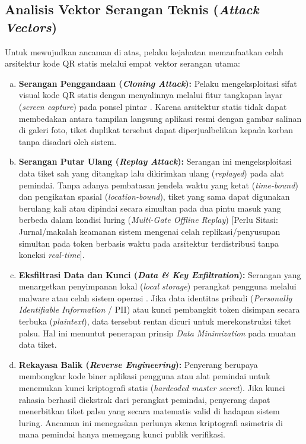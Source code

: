 \subsection{Analisis Vektor Serangan Teknis (\textit{Attack Vectors})}
Untuk mewujudkan ancaman di atas, pelaku kejahatan memanfaatkan celah arsitektur kode QR statis melalui empat vektor serangan utama:

\begin{enumerate}[a)]
    \item \textbf{Serangan Penggandaan (\textit{Cloning Attack}): }
    Pelaku mengeksploitasi sifat visual kode QR statis dengan menyalinnya melalui fitur tangkapan layar (\textit{screen capture}) pada ponsel pintar \cite{sung2015security}. Karena arsitektur statis tidak dapat membedakan antara tampilan langsung aplikasi resmi dengan gambar salinan di galeri foto, tiket duplikat tersebut dapat diperjualbelikan kepada korban tanpa disadari oleh sistem.
    
    \item \textbf{Serangan Putar Ulang (\textit{Replay Attack}): }
    Serangan ini mengeksploitasi data tiket sah yang ditangkap lalu dikirimkan ulang (\textit{replayed}) pada alat pemindai. Tanpa adanya pembatasan jendela waktu yang ketat (\textit{time-bound}) dan pengikatan spasial (\textit{location-bound}), tiket yang sama dapat digunakan berulang kali atau dipindai secara simultan pada dua pintu masuk yang berbeda dalam kondisi luring (\textit{Multi-Gate Offline Replay}) [Perlu Sitasi: Jurnal/makalah keamanan sistem mengenai celah replikasi/penyusupan simultan pada token berbasis waktu pada arsitektur terdistribusi tanpa koneksi \textit{real-time}].
    
    \item \textbf{Eksfiltrasi Data dan Kunci (\textit{Data \& Key Exfiltration}): }
    Serangan yang menargetkan penyimpanan lokal (\textit{local storage}) perangkat pengguna melalui malware atau celah sistem operasi \cite{sung2015security}. Jika data identitas pribadi (\textit{Personally Identifiable Information} / PII) atau kunci pembangkit token disimpan secara terbuka (\textit{plaintext}), data tersebut rentan dicuri untuk merekonstruksi tiket palsu. Hal ini menuntut penerapan prinsip \textit{Data Minimization} pada muatan data tiket.
    
    \item \textbf{Rekayasa Balik (\textit{Reverse Engineering}): }
    Penyerang berupaya membongkar kode biner aplikasi pengguna atau alat pemindai untuk menemukan kunci kriptografi statis (\textit{hardcoded master secret}). Jika kunci rahasia berhasil diekstrak dari perangkat pemindai, penyerang dapat menerbitkan tiket palsu yang secara matematis valid di hadapan sistem luring. Ancaman ini menegaskan perlunya skema kriptografi asimetris di mana pemindai hanya memegang kunci publik verifikasi.
\end{enumerate}

